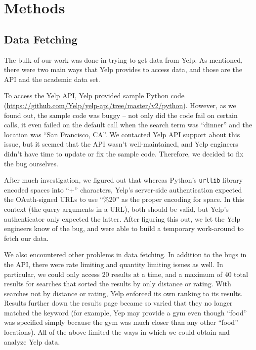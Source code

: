 \documentclass{article}
\begin{document}
\section{Methods}
\label{sec:methods}

\subsection{Data Fetching}

The bulk of our work was done in trying to get data from Yelp. As
mentioned, there were two main ways that Yelp provides to access data, and
those are the API and the academic data set.

To access the Yelp API, Yelp provided sample Python code
(\url{https://github.com/Yelp/yelp-api/tree/master/v2/python}). However, as
we found out, the sample code was buggy -- not only did the code fail on
certain calls, it even failed on the default call when the search term was
``dinner'' and the location was ``San Francisco, CA''. We contacted Yelp
API support about this issue, but it seemed that the API wasn't
well-maintained, and Yelp engineers didn't have time to update or fix the
sample code. Therefore, we decided to fix the bug ourselves.

After much investigation, we figured out that whereas Python's
\texttt{urllib} library encoded spaces into ``+'' characters, Yelp's
server-side authentication expected the OAuth-signed URLs to use ``\%20''
as the proper encoding for space. In this context (the query arguments in a
URL), both should be valid, but Yelp's authenticator only expected the
latter. After figuring this out, we let the Yelp engineers know of the bug,
and were able to build a temporary work-around to fetch our data.

We also encountered other problems in data fetching. In addition to the
bugs in the API, there were rate limiting and quantity limiting issues as
well. In particular, we could only access 20 results at a time, and a
maximum of 40 total results for searches that sorted the results by only
distance or rating. With searches not by distance or rating, Yelp enforced
its own ranking to its results. Results further down the results page
became so varied that they no longer matched the keyword (for example, Yep
may provide a gym even though ``food'' was specified simply because the gym
was much closer than any other ``food'' locations). All of the above
limited the ways in which we could obtain and analyze Yelp data.
\end{document}
